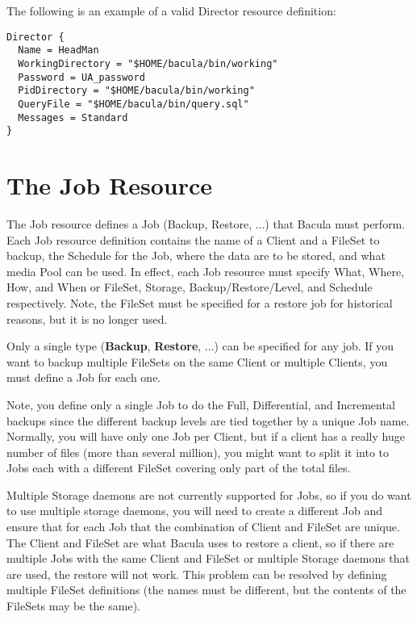 The following is an example of a valid Director resource definition: 

\footnotesize
\begin{verbatim}
Director {
  Name = HeadMan
  WorkingDirectory = "$HOME/bacula/bin/working"
  Password = UA_password
  PidDirectory = "$HOME/bacula/bin/working"
  QueryFile = "$HOME/bacula/bin/query.sql"
  Messages = Standard
}
\end{verbatim}
\normalsize

\section{The Job Resource}
\label{JobResource}

The Job resource defines a Job (Backup, Restore, ...) that Bacula must
perform. Each Job resource definition contains the name of a Client and
a FileSet to backup, the Schedule for the Job, where the data
are to be stored, and what media Pool can be used. In effect, each Job
resource must specify What, Where, How, and When or FileSet, Storage,
Backup/Restore/Level, and Schedule respectively. Note, the FileSet must
be specified for a restore job for historical reasons, but it is no longer used.

Only a single type ({\bf Backup}, {\bf Restore}, ...) can be specified for any
job. If you want to backup multiple FileSets on the same Client or multiple
Clients, you must define a Job for each one. 

Note, you define only a single Job to do the Full, Differential, and
Incremental backups since the different backup levels are tied together by 
a unique Job name.  Normally, you will have only one Job per Client, but   
if a client has a really huge number of files (more than several million),
you might want to split it into to Jobs each with a different FileSet
covering only part of the total files.

Multiple Storage daemons are not currently supported for Jobs, so if
you do want to use multiple storage daemons, you will need to create
a different Job and ensure that for each Job that the combination of
Client and FileSet are unique.  The Client and FileSet are what Bacula
uses to restore a client, so if there are multiple Jobs with the same
Client and FileSet or multiple Storage daemons that are used, the
restore will not work.  This problem can be resolved by defining multiple
FileSet definitions (the names must be different, but the contents of
the FileSets may be the same).
               

